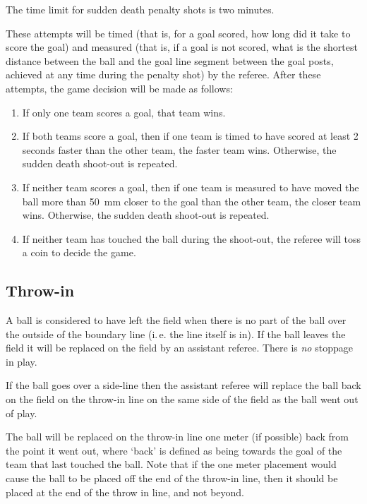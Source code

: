 \documentclass[12pt]{article}
\newcommand{\ie}{\mbox{i.\,e.}\xspace}
\begin{document}
The time limit for sudden death penalty shots is two minutes.

These attempts will be timed (that is, for a goal scored, how long did it take to score the goal) and measured (that is, if a goal is not scored, what is the shortest distance between the ball and the goal line segment between the goal posts, achieved at any time during the penalty shot) by the referee. After these attempts, the game decision will be made as follows:

\begin{enumerate}

\item If only one team scores a goal, that team wins.

\item If both teams score a goal, then if one team is timed to have scored at least 2 seconds faster than the other team, the faster team wins. Otherwise, the sudden death shoot-out is repeated.

\item If neither team scores a goal, then if one team is measured to have moved the ball more than 50~mm closer to the goal than the other team, the closer team wins. Otherwise, the sudden death shoot-out is repeated.

\item If neither team has touched the ball during the shoot-out, the referee will toss a coin to decide the game.

\end{enumerate}

\subsection{Throw-in}\label{sec:throw_in}

A ball is considered to have left the field when there is no part of the ball over the outside of the boundary line (\ie the line itself is in). If the ball leaves the field it will be replaced on the field by an assistant referee. There is \emph{no} stoppage in play.

If the ball goes over a side-line then the assistant referee will replace the ball back on the field on the throw-in line on the same side of the field as the ball went out of play.

The ball will be replaced on the throw-in line one meter (if possible) back from the point it went out, where `back' is defined as being towards the goal of the team that last touched the ball. Note that if the one meter placement would cause the ball to be placed off the end of the throw-in line, then it should be placed at the end of the throw in line, and not beyond.
\end{document}
